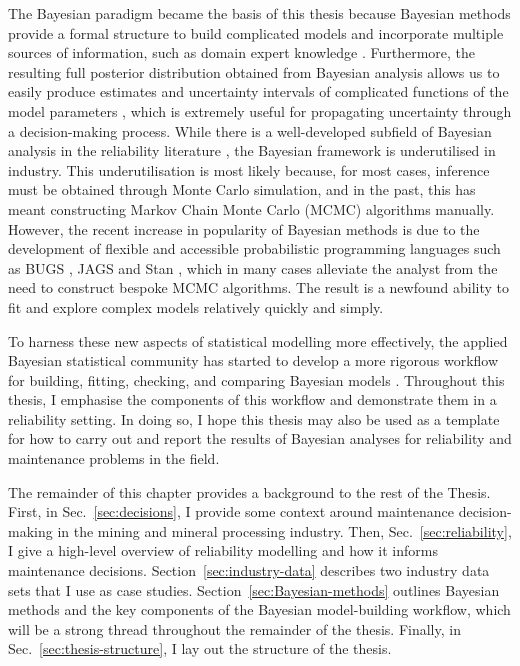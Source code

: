 The Bayesian paradigm became the basis of this thesis because Bayesian methods provide a formal structure to build complicated models and incorporate multiple sources of information, such as domain expert knowledge \citep{Meeker2022}. Furthermore, the resulting full posterior distribution obtained from Bayesian analysis allows us to easily produce estimates and uncertainty intervals of complicated functions of the model parameters \citep{Meeker2022}, which is extremely useful for propagating uncertainty through a decision-making process. While there is a well-developed subfield of Bayesian analysis in the reliability literature \citep{hamada_2008, Meeker2022}, the Bayesian framework is underutilised in industry. This underutilisation is most likely because, for most cases, inference must be obtained through Monte Carlo simulation, and in the past, this has meant constructing Markov Chain Monte Carlo (MCMC) algorithms manually. However, the recent increase in popularity of Bayesian methods is due to the development of flexible and accessible probabilistic programming languages such as BUGS \citep{lunn2012}, JAGS \citep{plummer2003} and Stan \citep{Stan2022}, which in many cases alleviate the analyst from the need to construct bespoke MCMC algorithms. The result is a newfound ability to fit and explore complex models relatively quickly and simply.

To harness these new aspects of statistical modelling more effectively, the applied Bayesian statistical community has started to develop a more rigorous workflow for building, fitting, checking, and comparing Bayesian models \citep{gelman_workflow_2020}. Throughout this thesis, I emphasise the components of this workflow and demonstrate them in a reliability setting. In doing so, I hope this thesis may also be used as a template for how to carry out and report the results of Bayesian analyses for reliability and maintenance problems in the field.

The remainder of this chapter provides a background to the rest of the Thesis. First, in Sec.~\ref{sec:decisions}, I provide some context around maintenance decision-making in the mining and mineral processing industry. Then, Sec.~\ref{sec:reliability}, I give a high-level overview of reliability modelling and how it informs maintenance decisions. Section~\ref{sec:industry-data} describes two industry data sets that I use as case studies. Section~\ref{sec:Bayesian-methods} outlines Bayesian methods and the key components of the Bayesian model-building workflow, which will be a strong thread throughout the remainder of the thesis. Finally, in Sec.~\ref{sec:thesis-structure}, I lay out the structure of the thesis.

